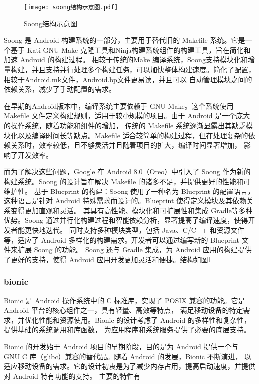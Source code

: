 \begin{figure}[h]
  \centering
  \texttt{[image: soong结构示意图.pdf]}
  \caption{Soong结构示意图}\label{fig:Soong结构示意图}
\end{figure}

Soong 是 Android 构建系统的一部分，主要用于替代旧的 Makefile 系统。它是一个基于 Kati GNU Make 克隆工具和Ninja构建系统组件的构建工具，旨在简化和加速 Android 的构建过程。
相较于传统的Make 编译系统，Soong支持模块化和增量构建，并且支持并行处理多个构建任务，可以加快整体构建速度。简化了配置，相较于Android.mk文件，Android.bp文件更易读，并且可以
自动管理模块之间的依赖关系，减少了手动配置的需求。

在早期的Android版本中，编译系统主要依赖于 GNU Make。这个系统使用 Makefile 文件定义构建规则，适用于较小规模的项目。由于 Android 是一个庞大的操作系统，随着功能和组件的增加，
传统的 Makefile 系统逐渐显露出其缺乏模块化以及编译时间长等缺点。Makefile 适合较简单的构建过程，但在处理复杂的依赖关系时，效率较低，且不够灵活并且随着项目的扩大，编译时间显著增加，
影响了开发效率。

而为了解决这些问题，Google 在 Android 8.0（Oreo）中引入了 Soong 作为新的构建系统。Soong 的设计旨在解决 Makefile 的诸多不足，并提供更好的性能和可维护性。
基于 Blueprint 的构建：Soong 使用了一种名为 Blueprint 的配置语言，这种语言是针对 Android 特殊需求而设计的。Blueprint 使得定义模块及其依赖关系变得更加直观和灵活。
其具有高性能、模块化和可扩展性和集成 Gradle等多种优势。Soong 通过并行化构建过程和智能依赖分析，显著提高了编译速度，使得开发者能更快地迭代。
同时支持多种模块类型，包括 Java、C/C++ 和资源文件等，适应了 Android 多样化的构建需求。开发者可以通过编写新的 Blueprint 文件来扩展 Soong 的功能。
Soong 还与 Gradle 集成，为 Android 应用的构建提供了更好的支持，使得 Android 应用开发更加灵活和便捷。结构如图\ref{fig:Soong结构示意图}

\subsubsection{bionic}

Bionic 是 Android 操作系统中的 C 标准库，实现了 POSIX 兼容的功能。它是 Android 平台的核心组件之一，具有轻量、高效等特点，
满足移动设备的特定需求，并优化性能和资源使用。Bionic 的设计考虑了 Android 的多样性和复杂性，提供基础的系统调用和库函数，
为应用程序和系统服务提供了必要的底层支持。

Bionic 的开发始于 Android 项目的早期阶段，目的是为 Android 提供一个与 GNU C 库（glibc）兼容的替代品。随着 Android 的发展，Bionic 不断演进，
以适应移动设备的需求。它的设计初衷是为了减少内存占用，提高启动速度，并提供对 Android 特有功能的支持。
主要的特性有


